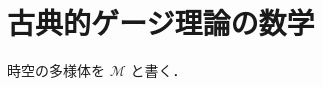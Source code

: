 \documentclass[TQFT_main]{subfiles}
\begin{document}

\section{古典的ゲージ理論の数学}

時空の多様体を $\mathcal{M}$ と書く．

\end{document}
